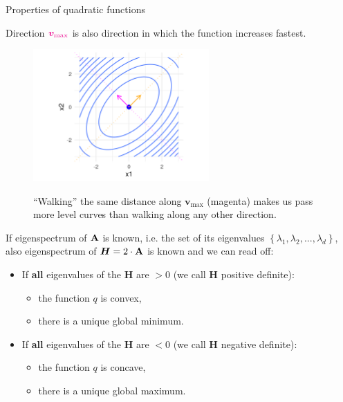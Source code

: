 \documentclass[11pt,compress,t,notes=noshow, xcolor=table]{beamer}
\begin{document}
  
  \begin{vbframe}{Properties of quadratic functions}
  
  Direction $\textcolor{magenta}{\bm{v}_\text{max}}$ is also direction in which the function increases fastest. 
  
  \begin{figure}
    \includegraphics[width=0.6\textwidth]{figure_man/quadratic_functions_2D_example_1_7.png} \\
    \begin{footnotesize}
    \enquote{Walking} the same distance along $\bm{v}_\text{max}$ (magenta) makes us pass more level curves than walking along any other direction.
    \end{footnotesize} 
  \end{figure}
  
  
  \framebreak 
  
  If eigenspectrum of $\mathbf{A}$ is known, i.e. the set of its eigenvalues $\left\{\lambda_1, \lambda_2, ..., \lambda_d\right\}$, also eigenspectrum of $\bm{H} = 2\cdot \mathbf{A}$ is known and we can read off:
  
  \begin{itemize}
    \item If \textbf{all} eigenvalues of the $\bm{H}$ are $>0$ (we call $\bm{H}$ positive definite): 
    \begin{itemize} 
      \item the function $q$ is convex,
      \item there is a unique global minimum. 
    \end{itemize}
    \item If \textbf{all} eigenvalues of the $\bm{H}$ are $<0$ (we call $\bm{H}$ negative definite): 
    \begin{itemize} 
      \item the function $q$ is concave,
      \item there is a unique global maximum. 
    \end{itemize}
  

\end{itemize}
\end{vbframe}
\end{document}
